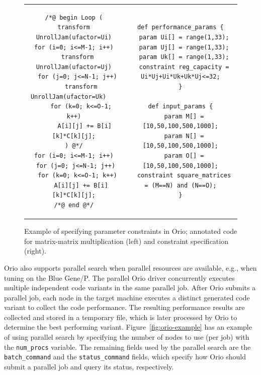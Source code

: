 \begin{figure}[htp] 
\centering 
\begin{tabular}{cc} 
\begin{minipage}{.4\textwidth}  
\scriptsize
\begin{verbatim}  
/*@ begin Loop (
transform UnrollJam(ufactor=Ui)
for (i=0; i<=M-1; i++)
  transform UnrollJam(ufactor=Uj)
  for (j=0; j<=N-1; j++)
    transform UnrollJam(ufactor=Uk)   
    for (k=0; k<=O-1; k++)
      A[i][j] += B[i][k]*C[k][j];
) @*/
for (i=0; i<=M-1; i++)
 for (j=0; j<=N-1; j++)
  for (k=0; k<=O-1; k++)
    A[i][j] += B[i][k]*C[k][j];
/*@ end @*/
\end{verbatim}  
\end{minipage}
&
\begin{minipage}{.45\textwidth}  
\scriptsize
\begin{verbatim}  
def performance_params {
  param Ui[] = range(1,33);
  param Uj[] = range(1,33);
  param Uk[] = range(1,33);
  constraint reg_capacity = Ui*Uj+Ui*Uk+Uk*Uj<=32;
}

def input_params {
  param M[] = [10,50,100,500,1000];
  param N[] = [10,50,100,500,1000];
  param O[] = [10,50,100,500,1000];
  constraint square_matrices = (M==N) and (N==O);
}

\end{verbatim}  
\end{minipage}
\\
\end{tabular}
\caption{Example of specifying parameter constraints in Orio; annotated code for matrix-matrix multiplication (left) and constraint specification (right).}
\label{fig:par-constraint}  
\end{figure} 

Orio also supports parallel search when parallel resources are available,
e.g., when tuning on the Blue Gene/P. The parallel Orio driver concurrently
executes multiple independent code variants in the same parallel job. After
Orio submits a parallel job, each node in the target machine executes a
distinct generated code variant to collect the code performance. The
resulting performance results are collected and stored in a temporary file,
which is later processed by Orio to determine the best performing variant.
Figure~\ref{fig:orio-example} has an example of using parallel search by
specifying the number of nodes to use (per job) with the \texttt{num\_procs}
variable. The remaining fields used by the parallel search are the
\texttt{batch\_command} and the \texttt{status\_command} fields, which specify how Orio
should submit a parallel job and query its status, respectively.

